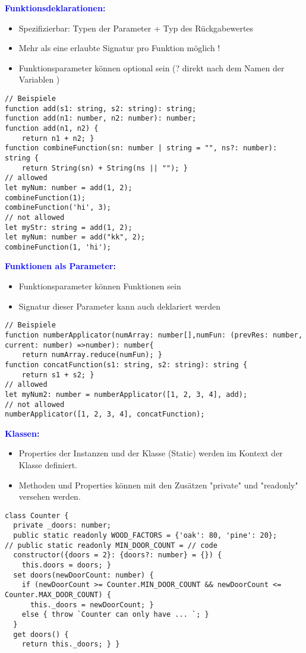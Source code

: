\textbf{\textcolor{blue}{Funktionsdeklarationen:}}
\begin{itemize}[topsep=0pt, leftmargin=3mm]
    \setlength\itemsep{-0.3em}
    \item Spezifizierbar: Typen der Parameter + Typ des Rückgabewertes
    \item Mehr als eine erlaubte Signatur pro Funktion möglich !
    \item Funktionsparameter können optional sein (? direkt nach dem Namen der Variablen )
\end{itemize}
\begin{lstlisting}[style=htmlcssjs]
// Beispiele
function add(s1: string, s2: string): string;
function add(n1: number, n2: number): number;
function add(n1, n2) {
    return n1 + n2; }
function combineFunction(sn: number | string = "", ns?: number): string {
    return String(sn) + String(ns || ""); }
// allowed
let myNum: number = add(1, 2);
combineFunction(1);
combineFunction('hi', 3);
// not allowed
let myStr: string = add(1, 2);
let myNum: number = add("kk", 2);
combineFunction(1, 'hi');
\end{lstlisting}
\textbf{\textcolor{blue}{Funktionen als Parameter:}}
\begin{itemize}[topsep=0pt, leftmargin=3mm]
    \setlength\itemsep{-0.3em}
    \item Funktionsparameter können Funktionen sein
    \item Signatur dieser Parameter kann auch deklariert werden
\end{itemize}
\begin{lstlisting}[style=htmlcssjs]
// Beispiele
function numberApplicator(numArray: number[],numFun: (prevRes: number, current: number) =>number): number{
    return numArray.reduce(numFun); }
function concatFunction(s1: string, s2: string): string {
    return s1 + s2; }
// allowed
let myNum2: number = numberApplicator([1, 2, 3, 4], add);
// not allowed
numberApplicator([1, 2, 3, 4], concatFunction);
\end{lstlisting}
\textbf{\textcolor{blue}{Klassen:}}
\begin{itemize}[topsep=0pt, leftmargin=3mm]
    \setlength\itemsep{-0.3em}
    \item Properties der Instanzen und der Klasse (Static) werden im Kontext der Klasse definiert.
    \item Methoden und Properties können mit den Zusätzen "private" und "readonly" versehen werden.
\end{itemize}
\begin{lstlisting}[style=htmlcssjs]
class Counter {
  private _doors: number;
  public static readonly WOOD_FACTORS = {'oak': 80, 'pine': 20};
// public static readonly MIN_DOOR_COUNT = // code
  constructor({doors = 2}: {doors?: number} = {}) {
    this.doors = doors; }
  set doors(newDoorCount: number) {
    if (newDoorCount >= Counter.MIN_DOOR_COUNT && newDoorCount <= Counter.MAX_DOOR_COUNT) {
      this._doors = newDoorCount; }
    else { throw `Counter can only have ... `; }
  }
  get doors() {
    return this._doors; } }
\end{lstlisting}
